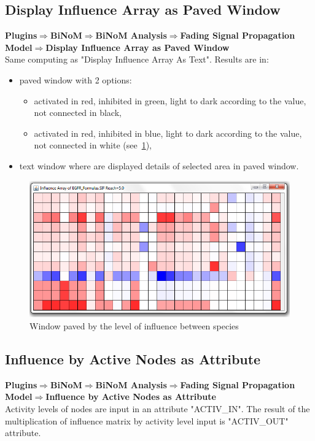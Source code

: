 \subsection{Display Influence Array as Paved Window}
\textbf{Plugins$\Rightarrow$BiNoM$\Rightarrow$BiNoM Analysis$\Rightarrow$Fading Signal Propagation Model$\Rightarrow$Display Influence Array as Paved Window}\\
Same computing as "Display Influence Array As Text". Results are in:
\begin{itemize}
\item paved window with 2 options: 
\begin{itemize}
\item activated in red, inhibited in green, light to dark according to the value, not connected in black,
\item activated in red, inhibited in blue, light to dark according to the value, not connected in white (see~\ref{paved_window}),
\end{itemize}
\item text window where are displayed details of selected area in paved window.
\end{itemize}

\begin{figure}
\centering
\includegraphics[width=1.0\textwidth]{graphics/paved_window}
\caption{Window paved by the level of influence between species}
\label{paved_window}
\end{figure}

\subsection{Influence by Active Nodes as Attribute}
\textbf{Plugins$\Rightarrow$BiNoM$\Rightarrow$BiNoM Analysis$\Rightarrow$Fading Signal Propagation Model$\Rightarrow$Influence by Active Nodes as Attribute}\\
Activity levels of nodes are input in an attribute "ACTIV\_IN". The result of the multiplication of influence matrix by activity level input is "ACTIV\_OUT" attribute.


